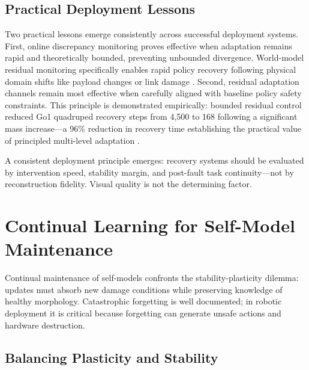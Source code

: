 ﻿\documentclass[12pt,a4paper,oneside]{report}
\begin{document}
\subsection{Practical Deployment Lessons}

Two practical lessons emerge consistently across successful deployment systems. First, online discrepancy monitoring proves effective when adaptation remains rapid and theoretically bounded, preventing unbounded divergence. World-model residual monitoring specifically enables rapid policy recovery following physical domain shifts like payload changes or link damage \cite{domberg2026selfadapting}. Second, residual adaptation channels remain most effective when carefully aligned with baseline policy safety constraints. This principle is demonstrated empirically: bounded residual control reduced Go1 quadruped recovery steps from 4,500 to 168 following a significant mass increase---a 96\% reduction in recovery time establishing the practical value of principled multi-level adaptation \cite{jayasinghe2026residual}.

A consistent deployment principle emerges: recovery systems should be evaluated by intervention speed, stability margin, and post-fault task continuity---not by reconstruction fidelity. Visual quality is not the determining factor.

\section{Continual Learning for Self-Model Maintenance}

Continual maintenance of self-models confronts the stability-plasticity dilemma: updates must absorb new damage conditions while preserving knowledge of healthy morphology. Catastrophic forgetting is well documented; in robotic deployment it is critical because forgetting can generate unsafe actions and hardware destruction.

\subsection{Balancing Plasticity and Stability}
\end{document}
